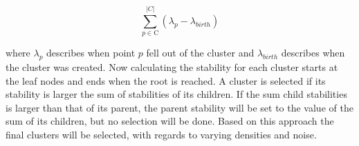 \begin{equation}
\sum_{p \in \text{C}}^{|C|} ({\lambda}_{p} - {\lambda}_{birth})
\end{equation}

 where ${\lambda}_{p}$ describes when point $p$ fell out of the cluster and $ {\lambda}_{birth}$ describes when the cluster was created. Now calculating the stability for each cluster starts at the leaf nodes and ends when the root is reached. A cluster is selected if its stability is larger the sum of stabilities of its children. If the sum child stabilities is larger than that of its parent, the parent stability will be set to the value of the sum of its children, but no selection will be done. Based on this approach the final clusters will be selected, with regards to varying densities and noise.